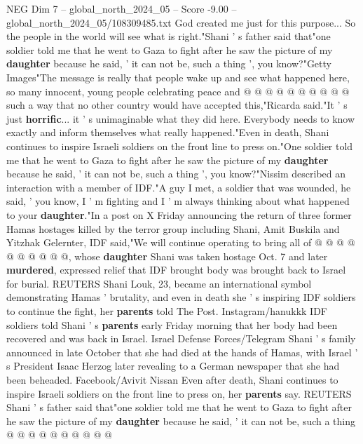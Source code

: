 \begin{textsample}{NEG Dim 7 – global\_north\_2024\_05 – Score -9.00 – global\_north\_2024\_05/108309485.txt}
God created me just for this purpose...
So the people in the world will see what is right."Shani ' s father said that"one soldier told me that he went to Gaza to fight after he saw the picture of my \textbf{daughter} because he said, ' it can not be, such a thing ', you know?"Getty Images"The message is really that people wake up and see what happened here, so many innocent, young people celebrating peace and @ @ @ @ @ @ @ @ @ @ such a way that no other country would have accepted this,"Ricarda said."It ' s just \textbf{horrific}... it ' s unimaginable what they did here.
Everybody needs to know exactly and inform themselves what really happened."Even in death, Shani continues to inspire Israeli soldiers on the front line to press on."One soldier told me that he went to Gaza to fight after he saw the picture of my \textbf{daughter} because he said, ' it can not be, such a thing ', you know?"Nissim described an interaction with a member of IDF."A guy I met, a soldier that was wounded, he said, ' you know, I ' m fighting and I ' m always thinking about what happened to your \textbf{daughter}."In a post on X Friday announcing the return of three former Hamas hostages killed by the terror group including Shani, Amit Buskila and Yitzhak Gelernter, IDF said,"We will continue operating to bring all of @ @ @ @ @ @ @ @ @ @, whose \textbf{daughter} Shani was taken hostage Oct. 7 and later \textbf{murdered}, expressed relief that IDF brought body was brought back to Israel for burial.
REUTERS Shani Louk, 23, became an international symbol demonstrating Hamas ' brutality, and even in death she ' s inspiring IDF soldiers to continue the fight, her \textbf{parents} told The Post.
Instagram/hanukkk IDF soldiers told Shani ' s \textbf{parents} early Friday morning that her body had been recovered and was back in Israel.
Israel Defense Forces/Telegram Shani ' s family announced in late October that she had died at the hands of Hamas, with Israel ' s President Isaac Herzog later revealing to a German newspaper that she had been beheaded.
Facebook/Avivit Nissan Even after death, Shani continues to inspire Israeli soldiers on the front line to press on, her \textbf{parents} say.
REUTERS Shani ' s father said that"one soldier told me that he went to Gaza to fight after he saw the picture of my \textbf{daughter} because he said, ' it can not be, such a thing @ @ @ @ @ @ @ @ @ @

\end{textsample}
